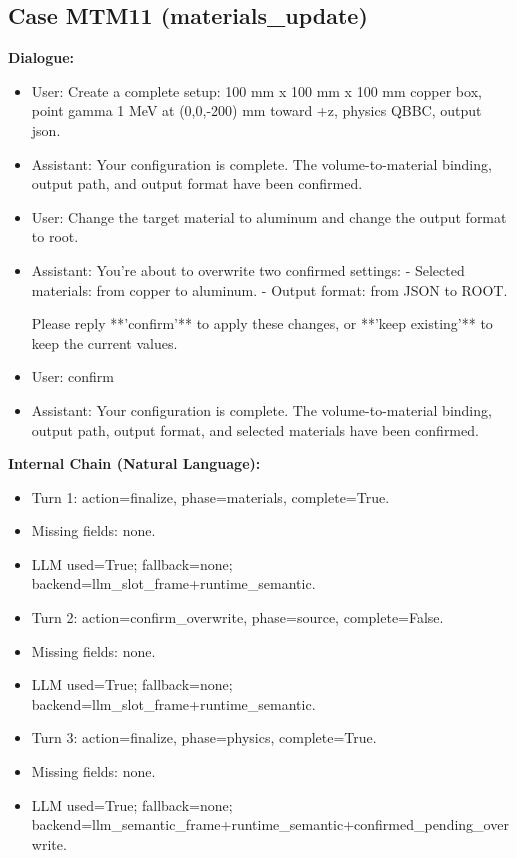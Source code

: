 \documentclass[11pt]{ctexart}
\begin{document}
\subsection{Case MTM11 (materials\_update)}
\textbf{Dialogue:}
\begin{itemize}
\item User: Create a complete setup: 100 mm x 100 mm x 100 mm copper box, point gamma 1 MeV at (0,0,-200) mm toward +z, physics QBBC, output json.
\item Assistant: Your configuration is complete. The volume-to-material binding, output path, and output format have been confirmed.
\item User: Change the target material to aluminum and change the output format to root.
\item Assistant: You're about to overwrite two confirmed settings:
- Selected materials: from copper to aluminum.
- Output format: from JSON to ROOT.

Please reply **'confirm'** to apply these changes, or **'keep existing'** to keep the current values.
\item User: confirm
\item Assistant: Your configuration is complete. The volume-to-material binding, output path, output format, and selected materials have been confirmed.
\end{itemize}
\textbf{Internal Chain (Natural Language):}
\begin{itemize}
\item Turn 1: action=finalize, phase=materials, complete=True.
\item Missing fields: none.
\item LLM used=True; fallback=none; backend=llm\_slot\_frame+runtime\_semantic.
\item Turn 2: action=confirm\_overwrite, phase=source, complete=False.
\item Missing fields: none.
\item LLM used=True; fallback=none; backend=llm\_slot\_frame+runtime\_semantic.
\item Turn 3: action=finalize, phase=physics, complete=True.
\item Missing fields: none.
\item LLM used=True; fallback=none; backend=llm\_semantic\_frame+runtime\_semantic+confirmed\_pending\_overwrite.
\end{itemize}
\end{document}
